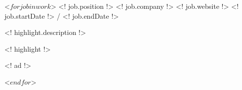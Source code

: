 \begin{cventries}
 <$ for job in work $>
  \cventry
    {<! job.position !>}
    {<! job.company !>}
    {<! job.website !>}
    {<! job.startDate !> / <! job.endDate !>}
    {
          \begin{cvitems}
                    \item{<! highlight.description !>}
                    \item{<! highlight !>}
                    \begin{cvitemssub}
                        \item{<! ad !>}
                    \end{cvitemssub}
          \end{cvitems}
    }
 <$ endfor $>
\end{cventries}
